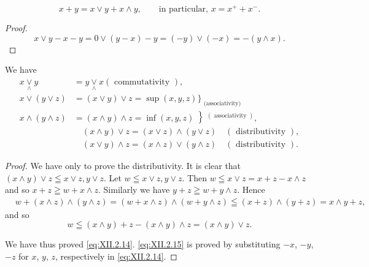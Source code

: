 \begin{corollaryu} 
\begin{equation}\label{eq:XII.2.10}
x+y=x\vee y+x\wedge y,\qquad\text{in particular, }x=x^++x^-.
\end{equation}
\end{corollaryu}

\begin{proof}
\[
x\vee y-x-y=0\vee(y-x)-y=(-y)\vee(-x)=-(y\wedge x).
\]
\end{proof}



\begin{proposition}\label{prop:XII.2.Proposition.3} We have 
\begin{align}
x \underset {\wedge} {\vee} y& = y \underset {\wedge} {\vee} x (\text{ commutativity }), \label{eq:XII.2.11} \\
x \vee (y \vee z)& = (x \vee y) \vee z = \sup (x, y, z) \Big \} _ {\text{ (associativity) }} \label{eq:XII.2.12} \\
x \wedge (y \wedge z)& = (x \wedge y) \wedge z = \inf (x, y, z) \left\} ^ {(\text{ associativity })}, \right. \label{eq:XII.2.13} \\
&\quad (x \wedge y) \vee z = (x \vee z) \wedge (y \vee z) \quad (\text{ distributivity }), \label{eq:XII.2.14} \\
&\quad (x \vee y) \wedge z = (x \wedge z) \vee (y \wedge z) \quad (\text{ distributivity }). \label{eq:XII.2.15}
\end{align}
\end{proposition}


\begin{proof}
 We have only to prove the distributivity. It is clear that $(x \wedge y) \vee z \leqq x \vee z, y \vee z$. Let $w \leqq x \vee z, y \vee z$. Then $w \leqq x \vee z = x + z - x \wedge z$ and so $x + z \geqq w + x \wedge z$. Similarly we have $y + z \geqq w + y \wedge z$. Hence 
\[
\begin{aligned}
&w + (x \wedge z) \wedge (y \wedge z) = (w + x \wedge z) \wedge (w + y \wedge z) \leqq (x + z) \wedge (y + z) = x \wedge y + z,
\end{aligned}
\]
and so 
\[
w \leqq (x \land y) + z - (x \land y) \land z = (x \land y) \lor z. \]

We have thus proved \eqref{eq:XII.2.14}. \eqref{eq:XII.2.15} is proved by substituting $-x$, $-y$, $-z$ for $x$, $y$, $z$, respectively in \eqref{eq:XII.2.14}. 
\end{proof}


